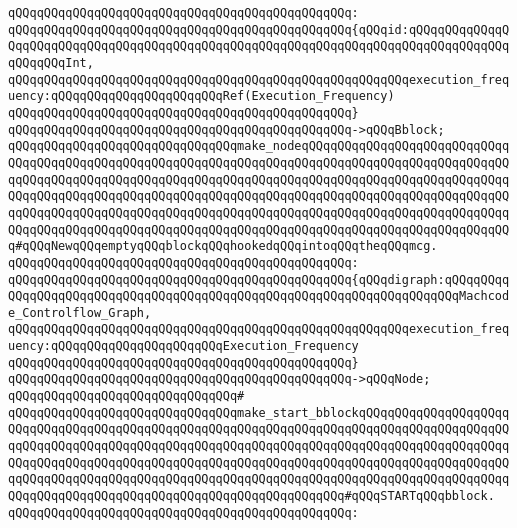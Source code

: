 \verb|qQQqqQQqqQQqqQQqqQQqqQQqqQQqqQQqqQQqqQQqqQQqqQQq:|\newline
\verb|qQQqqQQqqQQqqQQqqQQqqQQqqQQqqQQqqQQqqQQqqQQqqQQq{qQQqid:qQQqqQQqqQQqqQQqqQQqqQQqqQQqqQQqqQQqqQQqqQQqqQQqqQQqqQQqqQQqqQQqqQQqqQQqqQQqqQQqqQQqqQQqqQQqInt,|\newline
\verb|qQQqqQQqqQQqqQQqqQQqqQQqqQQqqQQqqQQqqQQqqQQqqQQqqQQqqQQqexecution_frequency:qQQqqQQqqQQqqQQqqQQqqQQqRef(Execution_Frequency)|\newline
\verb|qQQqqQQqqQQqqQQqqQQqqQQqqQQqqQQqqQQqqQQqqQQqqQQq}|\newline
\verb|qQQqqQQqqQQqqQQqqQQqqQQqqQQqqQQqqQQqqQQqqQQqqQQq->qQQqBblock;|\newline
\newline
\verb|qQQqqQQqqQQqqQQqqQQqqQQqqQQqqQQqmake_nodeqQQqqQQqqQQqqQQqqQQqqQQqqQQqqQQqqQQqqQQqqQQqqQQqqQQqqQQqqQQqqQQqqQQqqQQqqQQqqQQqqQQqqQQqqQQqqQQqqQQqqQQqqQQqqQQqqQQqqQQqqQQqqQQqqQQqqQQqqQQqqQQqqQQqqQQqqQQqqQQqqQQqqQQqqQQqqQQqqQQqqQQqqQQqqQQqqQQqqQQqqQQqqQQqqQQqqQQqqQQqqQQqqQQqqQQqqQQqqQQqqQQqqQQqqQQqqQQqqQQqqQQqqQQqqQQqqQQqqQQqqQQqqQQqqQQqqQQqqQQqqQQqqQQqqQQqqQQqqQQqqQQqqQQqqQQqqQQqqQQqqQQqqQQqqQQqqQQqqQQqqQQqqQQqqQQqqQQqqQQq#qQQqNewqQQqemptyqQQqblockqQQqhookedqQQqintoqQQqtheqQQqmcg.|\newline
\verb|qQQqqQQqqQQqqQQqqQQqqQQqqQQqqQQqqQQqqQQqqQQqqQQq:|\newline
\verb|qQQqqQQqqQQqqQQqqQQqqQQqqQQqqQQqqQQqqQQqqQQqqQQq{qQQqdigraph:qQQqqQQqqQQqqQQqqQQqqQQqqQQqqQQqqQQqqQQqqQQqqQQqqQQqqQQqqQQqqQQqqQQqqQQqMachcode_Controlflow_Graph,|\newline
\verb|qQQqqQQqqQQqqQQqqQQqqQQqqQQqqQQqqQQqqQQqqQQqqQQqqQQqqQQqexecution_frequency:qQQqqQQqqQQqqQQqqQQqqQQqExecution_Frequency|\newline
\verb|qQQqqQQqqQQqqQQqqQQqqQQqqQQqqQQqqQQqqQQqqQQqqQQq}|\newline
\verb|qQQqqQQqqQQqqQQqqQQqqQQqqQQqqQQqqQQqqQQqqQQqqQQq->qQQqNode;|\newline
\verb|qQQqqQQqqQQqqQQqqQQqqQQqqQQqqQQq#|\newline
\verb|qQQqqQQqqQQqqQQqqQQqqQQqqQQqqQQqmake_start_bblockqQQqqQQqqQQqqQQqqQQqqQQqqQQqqQQqqQQqqQQqqQQqqQQqqQQqqQQqqQQqqQQqqQQqqQQqqQQqqQQqqQQqqQQqqQQqqQQqqQQqqQQqqQQqqQQqqQQqqQQqqQQqqQQqqQQqqQQqqQQqqQQqqQQqqQQqqQQqqQQqqQQqqQQqqQQqqQQqqQQqqQQqqQQqqQQqqQQqqQQqqQQqqQQqqQQqqQQqqQQqqQQqqQQqqQQqqQQqqQQqqQQqqQQqqQQqqQQqqQQqqQQqqQQqqQQqqQQqqQQqqQQqqQQqqQQqqQQqqQQqqQQqqQQqqQQqqQQqqQQqqQQqqQQqqQQqqQQqqQQqqQQqqQQq#qQQqSTARTqQQqbblock.|\newline
\verb|qQQqqQQqqQQqqQQqqQQqqQQqqQQqqQQqqQQqqQQqqQQqqQQq:|\newline

